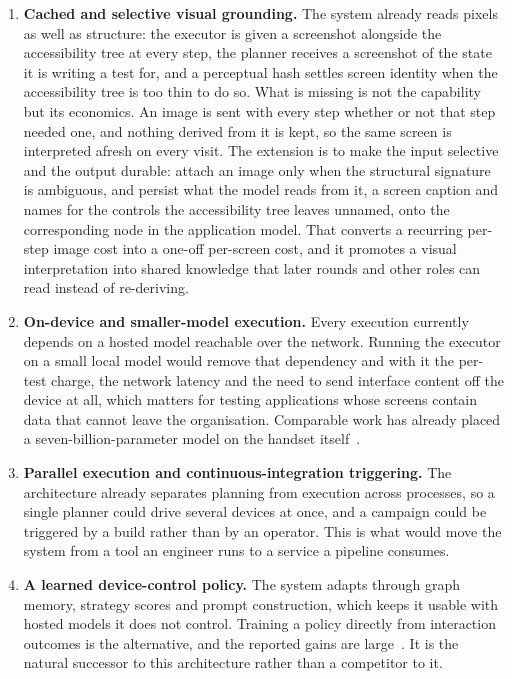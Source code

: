 \begin{enumerate}[label=\textbf{F\arabic*.},leftmargin=3.0em]
  \item \textbf{Cached and selective visual grounding.} The system already
    reads pixels as well as structure: the executor is given a screenshot
    alongside the accessibility tree at every step, the planner receives a
    screenshot of the state it is writing a test for, and a perceptual hash
    settles screen identity when the accessibility tree is too thin to do so.
    What is missing is not the capability but its economics. An image is sent
    with every step whether or not that step needed one, and nothing derived
    from it is kept, so the same screen is interpreted afresh on every visit.
    The extension is to make the input selective and the output durable: attach
    an image only when the structural signature is ambiguous, and persist what
    the model reads from it, a screen caption and names for the controls the
    accessibility tree leaves unnamed, onto the corresponding node in the
    application model. That converts a recurring per-step image cost into a
    one-off per-screen cost, and it promotes a visual interpretation into shared
    knowledge that later rounds and other roles can read instead of re-deriving.

  \item \textbf{On-device and smaller-model execution.} Every execution
    currently depends on a hosted model reachable over the network. Running the
    executor on a small local model would remove that dependency and with it the
    per-test charge, the network latency and the need to send interface content
    off the device at all, which matters for testing applications whose screens
    contain data that cannot leave the organisation. Comparable work has already
    placed a seven-billion-parameter model on the handset
    itself~\cite{autodroid}.

  \item \textbf{Parallel execution and continuous-integration triggering.} The
    architecture already separates planning from execution across processes, so
    a single planner could drive several devices at once, and a campaign could
    be triggered by a build rather than by an operator. This is what would move
    the system from a tool an engineer runs to a service a pipeline consumes.

  \item \textbf{A learned device-control policy.} The system adapts through
    graph memory, strategy scores and prompt construction, which keeps it usable
    with hosted models it does not control. Training a policy directly from
    interaction outcomes is the alternative, and the reported gains are
    large~\cite{digirl}. It is the natural successor to this architecture rather
    than a competitor to it.
\end{enumerate}

